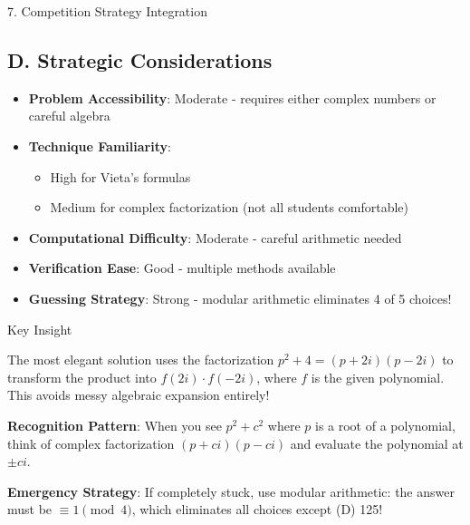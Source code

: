 \documentclass[12pt]{article}
\begin{document}
\begin{competitionbox}{7. Competition Strategy Integration}
\subsection*{D. Strategic Considerations}
\begin{itemize}[leftmargin=*]
    \item \textbf{Problem Accessibility}: Moderate - requires either complex numbers or careful algebra
    \item \textbf{Technique Familiarity}: 
    \begin{itemize}
        \item High for Vieta's formulas
        \item Medium for complex factorization (not all students comfortable)
    \end{itemize}
    \item \textbf{Computational Difficulty}: Moderate - careful arithmetic needed
    \item \textbf{Verification Ease}: Good - multiple methods available
    \item \textbf{Guessing Strategy}: Strong - modular arithmetic eliminates 4 of 5 choices!
\end{itemize}

\end{competitionbox}

\begin{highlightbox}{Key Insight}

The most elegant solution uses the factorization $p^2 + 4 = (p + 2i)(p - 2i)$ to transform the product into $f(2i) \cdot f(-2i)$, where $f$ is the given polynomial. This avoids messy algebraic expansion entirely!

\vspace{0.5em}
\noindent\textbf{Recognition Pattern}: When you see $p^2 + c^2$ where $p$ is a root of a polynomial, think of complex factorization $(p + ci)(p - ci)$ and evaluate the polynomial at $\pm ci$.

\vspace{0.5em}
\noindent\textbf{Emergency Strategy}: If completely stuck, use modular arithmetic: the answer must be $\equiv 1 \pmod{4}$, which eliminates all choices except (D) 125!

\end{highlightbox}
\end{document}
